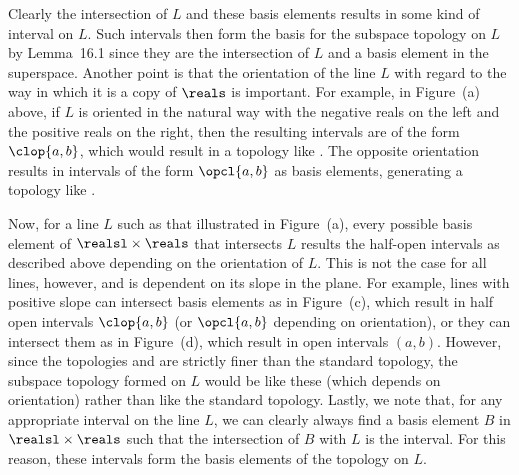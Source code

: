 {{
  }
  Clearly the intersection of $L$ and these basis elements results in some kind of interval on $L$.
  Such intervals then form the basis for the subspace topology on $L$ by Lemma~16.1 since they are the intersection of $L$ and a basis element in the superspace.
  Another point is that the orientation of the line $L$ with regard to the way in which it is a copy of $\reals$ is important.
  For example, in Figure~(a) above, if $L$ is oriented in the natural way with the negative reals on the left and the positive reals on the right, then the resulting intervals are of the form $\clop{a,b}$, which would result in a topology like \Rl.
  The opposite orientation results in intervals of the form $\opcl{a,b}$ as basis elements, generating a topology like \Ru.

  Now, for a line $L$ such as that illustrated in Figure~(a), every possible basis element of $\realsl \times \reals$ that intersects $L$ results the half-open intervals as described above depending on the orientation of $L$.
  This is not the case for all lines, however, and is dependent on its slope in the plane.
  For example, lines with positive slope can intersect basis elements as in Figure~(c), which result in half open intervals $\clop{a,b}$ (or $\opcl{a,b}$ depending on orientation), or they can intersect them as in Figure~(d), which result in open intervals $(a,b)$.
  However, since the topologies \Rl and \Ru are strictly finer than the standard topology, the subspace topology formed on $L$ would be like these (which depends on orientation) rather than like the standard topology.
  Lastly, we note that, for any appropriate interval on the line $L$, we can clearly always find a basis element $B$ in $\realsl \times \reals$ such that the intersection of $B$ with $L$ is the interval.
  For this reason, these intervals form the basis elements of the topology on $L$.

}
